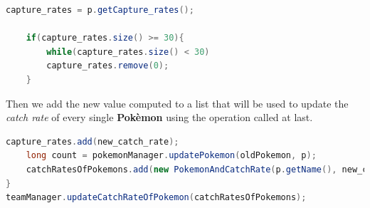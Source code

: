 \begin{lstlisting}[language=Java]
	capture_rates = p.getCapture_rates();
	
	if(capture_rates.size() >= 30){
		while(capture_rates.size() < 30)
		capture_rates.remove(0);
	}
\end{lstlisting}
Then we add the new value computed to a list that will be used to update the \textit{catch rate} of every single \textbf{Pokèmon} using the operation called at last.
\begin{lstlisting}[language=Java]
	capture_rates.add(new_catch_rate);
	long count = pokemonManager.updatePokemon(oldPokemon, p);
	catchRatesOfPokemons.add(new PokemonAndCatchRate(p.getName(), new_catch_rate));
}
teamManager.updateCatchRateOfPokemon(catchRatesOfPokemons);
\end{lstlisting}



